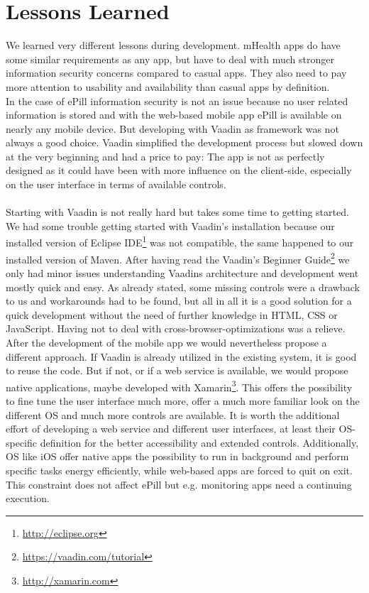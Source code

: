 \section{Lessons Learned}
\label{sec:LessonsLearned}
We learned very different lessons during development. mHealth apps do have some similar requirements as any app, but have to deal with much stronger information security concerns compared to casual apps. They also need to pay more attention to usability and availability than casual apps by definition. 
\\
In the case of ePill information security is not an issue because no user related information is stored and with the web-based mobile app ePill is available on nearly any mobile device. But developing with Vaadin as framework was not always a good choice. Vaadin simplified the development process but slowed down at the very beginning and had a price to pay: The app is not as perfectly designed as it could have been with more influence on the client-side, especially on the user interface in terms of available controls.
\\
\\
Starting with Vaadin is not really hard but takes some time to getting started. We had some trouble getting started with Vaadin's installation because our installed version of Eclipse IDE\footnote{\url{http://eclipse.org}} was not compatible, the same happened to our installed version of Maven. After having read the Vaadin's Beginner Guide\footnote{\url{https://vaadin.com/tutorial}} we only had minor issues understanding Vaadins architecture and development went mostly quick and easy. As already stated, some missing controls were a drawback to us and workarounds had to be found, but all in all it is a good solution for a quick development without the need of further knowledge in HTML, CSS or JavaScript. Having not to deal with cross-browser-optimizations was a relieve.
\\
After the development of the mobile app we would nevertheless propose a different approach. If Vaadin is already utilized in the existing system, it is good to reuse the code. But if not, or if a web service is available, we would propose native applications, maybe developed with Xamarin\footnote{\url{http://xamarin.com}}. This offers the possibility to fine tune the user interface much more, offer a much more familiar look on the different OS and much more controls are available. It is worth the additional effort of developing a web service and different user interfaces, at least their OS-specific definition for the better accessibility and extended controls. Additionally, OS like iOS offer native apps the possibility to run in background and perform specific tasks energy efficiently, while web-based apps are forced to quit on exit. This constraint does not affect ePill but e.g. monitoring apps need a continuing execution.

